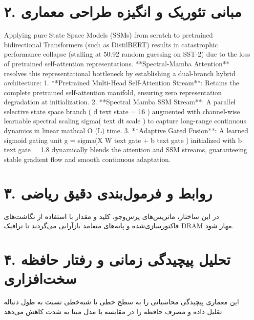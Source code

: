 \documentclass[12pt,a4paper]{article}
\begin{document}
\section*{۲. مبانی تئوریک و انگیزه طراحی معماری}
Applying pure State Space Models (SSMs) from scratch to pretrained bidirectional Transformers (such as DistilBERT) results in catastrophic performance collapse (stalling at 50.92 random guessing on SST-2) due to the loss of pretrained self-attention representations. **Spectral-Mamba Attention** resolves this representational bottleneck by establishing a dual-branch hybrid architecture: 1. **Pretrained Multi-Head Self-Attention Stream**: Retains the complete pretrained self-attention manifold, ensuring zero representation degradation at initialization. 2. **Spectral Mamba SSM Stream**: A parallel selective state space branch ( d text state = 16 ) augmented with channel-wise learnable spectral scaling sigma( text dt scale ) to capture long-range continuous dynamics in linear mathcal O (L) time. 3. **Adaptive Gated Fusion**: A learned sigmoid gating unit g = sigma(X W text gate + b text gate ) initialized with b text gate = 1.8 dynamically blends the attention and SSM streams, guaranteeing stable gradient flow and smooth continuous adaptation.

\section*{۳. روابط و فرمول‌بندی دقیق ریاضی}
در این ساختار، ماتریس‌های پرس‌وجو، کلید و مقدار با استفاده از نگاشت‌های فاکتورسازی‌شده و پایه‌های متعامد بازآرایی می‌گردند تا ترافیک DRAM مهار شود.

\section*{۴. تحلیل پیچیدگی زمانی و رفتار حافظه سخت‌افزاری}
این معماری پیچیدگی محاسباتی را به سطح خطی یا شبه‌خطی نسبت به طول دنباله تقلیل داده و مصرف حافظه را در مقایسه با مدل مبنا به شدت کاهش می‌دهد.
\end{document}
